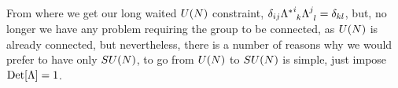 From where we get our long waited $U\qty(N)$ constraint, $\delta_{ij}\tensor{{\Lambda^\ast}}{^i_k}\tensor{\Lambda}{^j_l}=\delta_{kl}$, but, 
no longer we have any problem requiring the group to be connected, as $U\qty(N)$ is already connected, but nevertheless, there is a number of 
reasons why we would prefer to have only $SU\qty(N)$, to go from $U\qty(N)$ to $SU\qty(N)$ is simple, just impose $\textup{Det} \qty[\Lambda]=1$.





